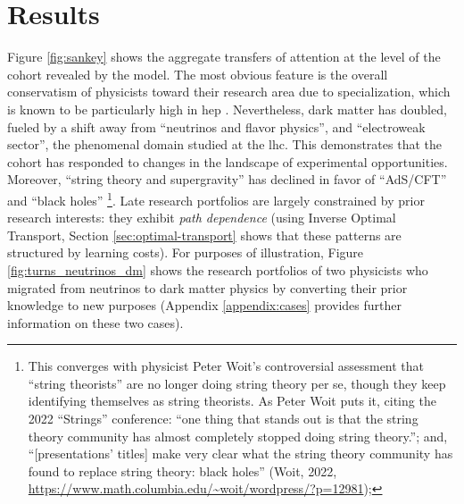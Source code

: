 \documentclass{article}
\begin{document}
 \section{\label{sec:results}Results}


Figure \ref{fig:sankey} shows the aggregate transfers of attention at the level of the cohort revealed by the model. %
The most obvious feature is the overall conservatism of physicists toward their research area due to specialization, which is known to be particularly high in \gls{hep} \citep{Aleta2019}. Nevertheless, dark matter has doubled, fueled by a shift away from ``neutrinos and flavor physics'', and ``electroweak sector'', the phenomenal domain studied at the \gls{lhc}. This demonstrates that the cohort has responded to changes in the landscape of experimental opportunities. Moreover, ``string theory and supergravity'' has declined in favor of ``AdS/CFT'' and ``black holes'' \footnote{This converges with physicist Peter Woit's controversial assessment that ``string theorists'' are no longer doing string theory per se, though they keep identifying themselves as string theorists. As Peter Woit puts it, citing the 2022 ``Strings'' conference: ``one thing that stands out is that the string theory community has almost completely stopped doing string theory.''; and, ``[presentations' titles] make very clear what the string theory community has found to replace string theory: black holes'' (Woit, 2022, \url{https://www.math.columbia.edu/~woit/wordpress/?p=12981});}. Late research portfolios are largely constrained by prior research interests: they exhibit \textit{path dependence} \citep{Galesic2023} (using Inverse Optimal Transport, Section \ref{sec:optimal-transport} shows that these patterns are structured by learning costs). For purposes of illustration, Figure \ref{fig:turns_neutrinos_dm} shows the research portfolios of two physicists who migrated from neutrinos to dark matter physics by converting their prior knowledge to new purposes (Appendix \ref{appendix:cases} provides further information on these two cases).

\end{document}
